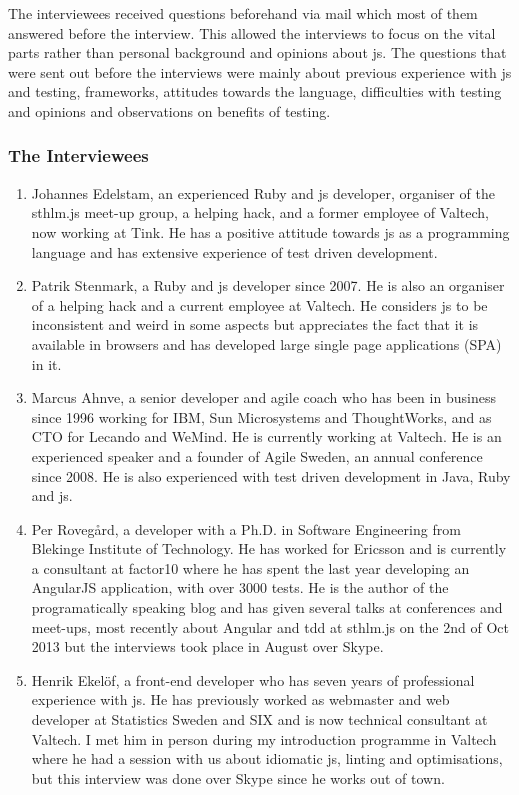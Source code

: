 \documentclass[11pt]{article}
\begin{document}
The interviewees received questions beforehand via mail which most of them answered before the interview. This allowed the interviews to focus on the vital parts rather than personal background and opinions about \gls{js}. The questions that were sent out before the interviews were mainly about previous experience with \gls{js} and testing, frameworks, attitudes towards the language, difficulties with testing and opinions and observations on benefits of testing.

\subsubsection{The Interviewees}
\label{ssubsec:interviewees}

\begin{enumerate}
\item Johannes Edelstam, an experienced Ruby and \gls{js} developer, organiser of the sthlm.js meet-up group, a helping hack, and a former employee of Valtech, now working at Tink. He has a positive attitude towards \gls{js} as a programming language and has extensive experience of test driven development.

\item Patrik Stenmark, a Ruby and \gls{js} developer since 2007. He is also an organiser of a helping hack and a current employee at Valtech. He considers \gls{js} to be inconsistent and weird in some aspects but appreciates the fact that it is available in browsers and has developed large single page applications (SPA) in it.

\item Marcus Ahnve, a senior developer and agile coach who has been in business since 1996 working for IBM, Sun Microsystems and ThoughtWorks, and as CTO for Lecando and WeMind. He is currently working at Valtech. He is an experienced speaker and a founder of Agile Sweden, an annual conference since 2008. He is also experienced with test driven development in Java, Ruby and \gls{js}.

\item Per Rovegård, a developer with a Ph.D. in Software Engineering from Blekinge Institute of Technology. He has worked for Ericsson and is currently a consultant at factor10 where he has spent the last year developing an AngularJS application, with over 3000 tests. He is the author of the programatically speaking blog and has given several talks at conferences and meet-ups, most recently about Angular and \gls{tdd} at sthlm.js on the 2nd of Oct 2013 but the interviews took place in August over Skype.

\item Henrik Ekelöf, a front-end developer who has seven years of professional experience with \gls{js}. He has previously worked as webmaster and web developer at Statistics Sweden and SIX and is now technical consultant at Valtech. I met him in person during my introduction programme in Valtech where he had a session with us about idiomatic \gls{js}, linting and optimisations, but this interview was done over Skype since he works out of town.
\end{enumerate}
\end{document}
